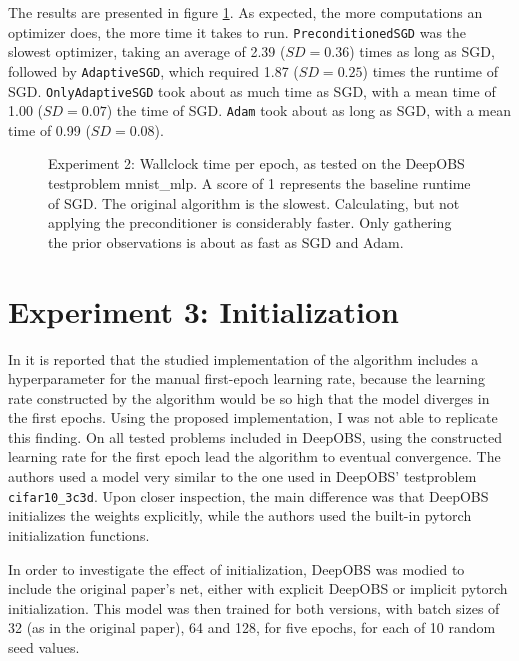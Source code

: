 \documentclass[twoside,12pt,a4paper]{report}
\begin{document}
The results are presented in figure \ref{fig:exp_perf_prec}. As expected, the more computations an optimizer does, the more time it takes to run.
\verb|PreconditionedSGD| was the slowest optimizer, taking an average of 2.39 ($SD = 0.36$) times as long as SGD, followed by \verb|AdaptiveSGD|, which required 1.87 ($SD = 0.25$) times the runtime of SGD. \verb|OnlyAdaptiveSGD| took about as much time as SGD, with a mean time of 1.00 ($SD = 0.07$) the time of SGD. \verb|Adam| took about as long as SGD, with a mean time of 0.99 ($SD = 0.08$).


\begin{figure}
	\centering \hspace{-1,5cm}
	
	\caption{Experiment 2: Wallclock time per epoch, as tested on the DeepOBS testproblem mnist\_mlp. A score of 1 represents the baseline runtime of SGD. The original algorithm is the slowest. Calculating, but not applying the preconditioner is considerably faster. Only gathering the prior observations is about as fast as SGD and Adam.}
	\label{fig:exp_perf_prec}
	
\end{figure}


\section{Experiment 3: Initialization}
In \cite{roos2019active} it is reported that the studied implementation of the algorithm includes a hyperparameter for the manual first-epoch learning rate, because the learning rate constructed by the algorithm would be so high that the model diverges in the first epochs. Using the proposed implementation, I was not able to replicate this finding. On all tested problems included in DeepOBS, using the constructed learning rate for the first epoch lead the algorithm to eventual convergence. The authors used a model very similar to the one used in DeepOBS' testproblem \verb|cifar10_3c3d|. Upon closer inspection, the main difference was that DeepOBS initializes the weights explicitly, while the authors used the built-in pytorch initialization functions.

In order to investigate the effect of initialization, DeepOBS was modied to include the original paper's net, either with explicit DeepOBS or implicit pytorch initialization. This model was then trained for both versions, with batch sizes of 32 (as in the original paper), 64 and 128, for five epochs, for each of 10 random seed values.
\end{document}
